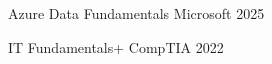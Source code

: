 

\begin{cvhonors}

  \cvhonor
    {Azure Data Fundamentals} %
    {Microsoft} %
    {} %
    {2025} %

  \cvhonor
    {IT Fundamentals+} %
    {CompTIA} %
    {} %
    {2022} %
    
\end{cvhonors}